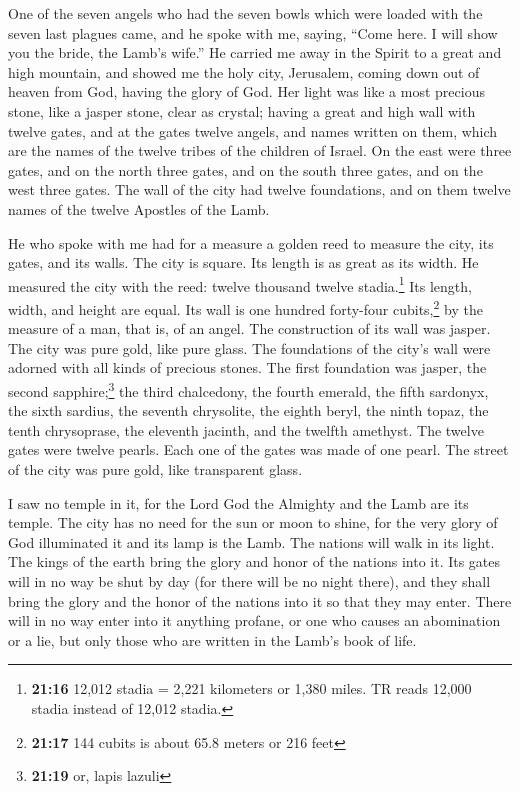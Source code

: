  One of the seven angels who had the seven bowls which
were loaded with the seven last plagues came, and he spoke with me,
saying, ``Come here. I will show you the bride, the Lamb's wife.''
 He carried me away in the Spirit to a great and high
mountain, and showed me the holy city, Jerusalem, coming down out of
heaven from God,  having the glory of God. Her light was
like a most precious stone, like a jasper stone, clear as crystal;
 having a great and high wall with twelve gates, and at
the gates twelve angels, and names written on them, which are the names
of the twelve tribes of the children of Israel.  On the
east were three gates, and on the north three gates, and on the south
three gates, and on the west three gates.  The wall of
the city had twelve foundations, and on them twelve names of the twelve
Apostles of the Lamb.

 He who spoke with me had for a measure a golden reed to
measure the city, its gates, and its walls.  The city is
square. Its length is as great as its width. He measured the city with
the reed: twelve thousand twelve stadia.\footnote{\textbf{21:16} 12,012
  stadia = 2,221 kilometers or 1,380 miles. TR reads 12,000 stadia
  instead of 12,012 stadia.} Its length, width, and height are equal.
 Its wall is one hundred forty-four cubits,\footnote{\textbf{21:17}
  144 cubits is about 65.8 meters or 216 feet} by the measure of a man,
that is, of an angel.  The construction of its wall was
jasper. The city was pure gold, like pure glass.  The
foundations of the city's wall were adorned with all kinds of precious
stones. The first foundation was jasper, the second sapphire;\footnote{\textbf{21:19}
  or, lapis lazuli} the third chalcedony, the fourth emerald,
 the fifth sardonyx, the sixth sardius, the seventh
chrysolite, the eighth beryl, the ninth topaz, the tenth chrysoprase,
the eleventh jacinth, and the twelfth amethyst.  The
twelve gates were twelve pearls. Each one of the gates was made of one
pearl. The street of the city was pure gold, like transparent glass.

 I saw no temple in it, for the Lord God the Almighty and
the Lamb are its temple.  The city has no need for the
sun or moon to shine, for the very glory of God illuminated it and its
lamp is the Lamb.  The nations will walk in its light.
The kings of the earth bring the glory and honor of the nations into it.
 Its gates will in no way be shut by day (for there will
be no night there),  and they shall bring the glory and
the honor of the nations into it so that they may enter. 
There will in no way enter into it anything profane, or one who causes
an abomination or a lie, but only those who are written in the Lamb's
book of life.

